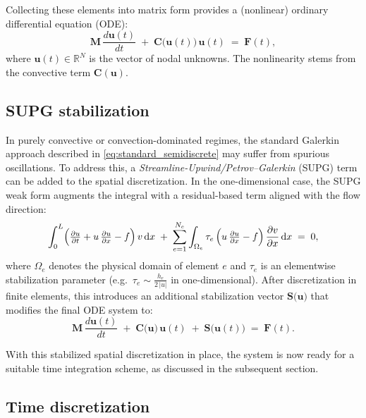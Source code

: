 Collecting these elements into matrix form provides a (nonlinear) ordinary differential equation (ODE):
\begin{equation}
\mathbf{M} \,\frac{d\mathbf{u}(t)}{dt} 
\;+\;
\mathbf{C}\bigl(\mathbf{u}(t)\bigr)\,\mathbf{u}(t)
\;=\;
\mathbf{F}(t),
\end{equation}
where \(\mathbf{u}(t) \in \mathbb{R}^N\) is the vector of nodal unknowns. The nonlinearity stems from the convective term \(\mathbf{C}(\mathbf{u})\). %

\subsection{SUPG stabilization}

In purely convective or convection-dominated regimes, the standard Galerkin approach described in \eqref{eq:standard_semidiscrete} may suffer from spurious oscillations. To address this, a \textit{Streamline-Upwind/Petrov--Galerkin} (SUPG) term can be added to the spatial discretization. In the one-dimensional case, the SUPG weak form augments the integral with a residual-based term aligned with the flow direction:
\begin{equation}
\int_0^L 
\Bigl(
\tfrac{\partial u}{\partial t} + u\,\tfrac{\partial u}{\partial x} - f
\Bigr)\,v
\,\mathrm{d}x
\;+\;
\sum_{e=1}^{N_e} 
\int_{\Omega_e} 
\tau_e \,
\Bigl(u\,\tfrac{\partial u}{\partial x} - f\Bigr)\,
\frac{\partial v}{\partial x}
\,\mathrm{d}x
\;=\;
0,
\end{equation}
where \(\Omega_e\) denotes the physical domain of element \(e\) and  \(\tau_e\) is an elementwise stabilization parameter (e.g.\ \(\tau_e \sim \tfrac{h_e}{2\,|u|}\) in one-dimensional). After discretization in finite elements, this introduces an additional stabilization vector \(\mathbf{S}\bigl(\mathbf{u}\bigr)\) that modifies the final ODE system to:
\begin{equation}
\mathbf{M} \,\frac{d\mathbf{u}(t)}{dt} 
\;+\;
\mathbf{C}\bigl(\mathbf{u}\bigr)\,\mathbf{u}(t)
\;+\;
\mathbf{S}\bigl(\mathbf{u}(t)\bigr)
\;=\;
\mathbf{F}(t).
\end{equation}

With this stabilized spatial discretization in place, the system is now ready for a suitable time integration scheme, as discussed in the subsequent section.


\subsection{Time discretization}

